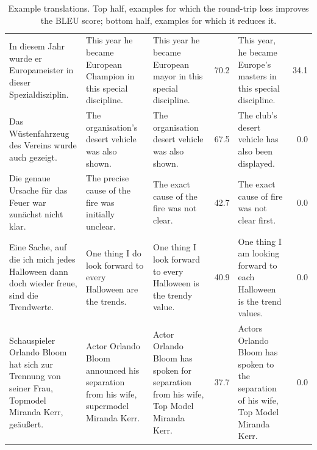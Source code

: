 \documentclass[10pt,a4paper]{article}
\begin{document}
\begin{table}
\begin{tabularx}{\textwidth}{XXXrXr}
		In diesem Jahr wurde er Europameister in dieser Spezialdisziplin. &
		This year he became European Champion in this special discipline. &	
		This year he became European mayor in this special discipline.	& 70.2 &
		This year, he became Europe’s masters in this special discipline.&	34.1\\
		
		Das Wüstenfahrzeug des Vereins wurde auch gezeigt. &
		The organisation's desert vehicle was also shown. &
		The organisation desert vehicle was also shown. & 67.5 &
		The club’s desert vehicle has also been displayed. & 0.0\\
		
		Die genaue Ursache für das Feuer war zunächst nicht klar. &
		The precise cause of the fire was initially unclear. &
		The exact cause of the fire was not clear. & 42.7 &
		The exact cause of fire was not clear first. & 0.0 \\
		
		Eine Sache, auf die ich mich jedes Halloween dann doch wieder freue, sind die Trendwerte. &	One thing I do look forward to every Halloween are the trends. &
		One thing I look forward to every Halloween is the trendy value. &	40.9 &
		One thing I am looking forward to each Halloween is the trend values. &	0.0 \\
		
		Schauspieler Orlando Bloom hat sich zur Trennung von seiner Frau, Topmodel Miranda Kerr, geäußert. &
		Actor Orlando Bloom announced his separation from his wife, supermodel Miranda Kerr. &	Actor Orlando Bloom has spoken for separation from his wife, Top Model Miranda Kerr. & 37.7 &
		Actors Orlando Bloom has spoken to the separation of his wife, Top Model Miranda Kerr. & 0.0\\
		\bottomrule
	\end{tabularx}
	\caption{Example translations. Top half, examples for which the round-trip loss improves the BLEU score; bottom half, examples for which it reduces it.}
	\label{t:translations}
\end{table}
\end{document}
